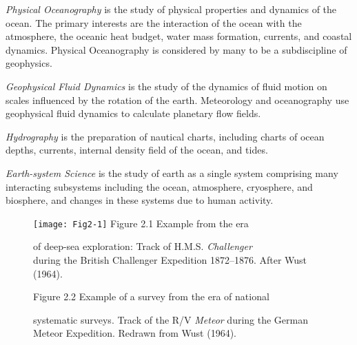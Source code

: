\textit{Physical Oceanography} is the
study of physical properties and dynamics of
the ocean. The primary interests are the interaction of the ocean with
the atmosphere, the oceanic heat budget, water mass formation,
currents, and coastal dynamics. Physical Oceanography is considered by
many to be a subdiscipline of geophysics.

\textit{Geophysical Fluid Dynamics} is
the study of the dynamics of
fluid motion on scales influenced by the rotation of the
earth. Meteorology and oceanography use geophysical fluid dynamics to
calculate planetary flow fields.

\textit{Hydrography} is the preparation of
nautical charts, including charts of ocean depths, currents, internal
density field of the ocean, and tides.

\textit{Earth-system Science} is
the study of earth as a single
system comprising many interacting subsystems including the ocean,
atmosphere, cryosphere, and biosphere, and changes in these systems
due to human activity.

\begin{figure}[t!]
\texttt{[image: Fig2-1]}
\centering
\footnotesize
Figure 2.1 Example from the era\rule{0pt}{3ex} of deep-sea
exploration: Track of H.M.S. \textit{Challenger}\\ during the British
Challenger Expedition 1872--1876. After Wust (1964).

\label{fig:Fig2-1}
\vspace{-3ex}
\end{figure}


\begin{figure}[t!]
\centering
\footnotesize
Figure 2.2 Example of a survey from the era of national\rule{0pt}{3ex}
systematic surveys. Track of the R/V \textit{Meteor} during the German
Meteor Expedition. Redrawn from Wust (1964).

\label{fig:Fig2-2}
\vspace{-3ex}
\end{figure}
